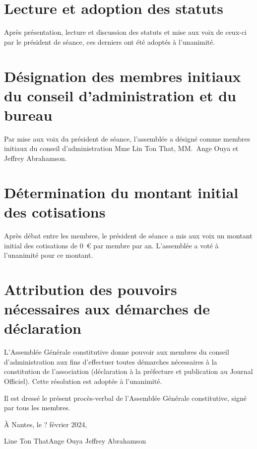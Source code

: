 \documentclass[12pt]{article}
\newcommand{\quand}{? février 2024}
\begin{document}
\section{Lecture et adoption des statuts}
\label{sec:lecture-et-adoption-des-statuts}

Après présentation, lecture et discussion des statuts et mise aux voix
de ceux-ci par le président de séance, ces derniers ont été adoptés à
l'unanimité.

\section{Désignation des membres initiaux du conseil d'administration
  et du bureau}
\label{sec:designation-des-membres}

Par mise aux voix du président de séance, l'assemblée a désigné comme
membres initiaux du conseil d'administration Mme Lin Ton That,
MM.~Ange Ouya et Jeffrey Abrahamson.

\section{Détermination du montant initial des cotisations}
\label{sec:determination-du-montant-initial-des-cotisations}

Après débat entre les membres, le président de séance a mis aux voix
un montant initial des cotisations de 0~\euro{} par membre par
an. L'assemblée a voté à l'unanimité pour ce montant.

\section{Attribution des pouvoirs nécessaires aux démarches de déclaration}
\label{sec:attribution-des-pouvoirs-necessaires-aux-demarches-de-declaration}

L'Assemblée Générale constitutive donne pouvoir aux membres du conseil
d'administration aux fins d'effectuer toutes démarches nécessaires à
la constitution de l'association (déclaration à la préfecture et
publication au Journal Officiel). Cette résolution est adoptée à
l'unanimité.

\vfill{}

Il est dressé le présent procès-verbal de l'Assemblée Générale
constitutive, signé par tous les membres.

\vspace{2cm}

\begin{flushright}
  À Nantes, le \quand{},
\end{flushright}

\vspace{2cm}

\hfile{}Line Ton That\hfill{}Ange Ouya \hspace{4cm} Jeffrey Abrahamson\hfill{}

\vfill
\end{document}
